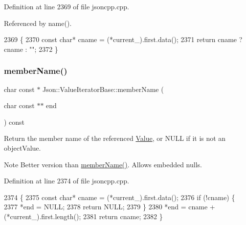Definition at line 2369 of file jsoncpp.\+cpp.



Referenced by name().


\begin{DoxyCode}
2369                                                 \{
2370   \textcolor{keyword}{const} \textcolor{keywordtype}{char}* cname = (*current\_).first.data();
2371   \textcolor{keywordflow}{return} cname ? cname : \textcolor{stringliteral}{""};
2372 \}
\end{DoxyCode}
\mbox{\label{class_json_1_1_value_iterator_base_a391c9cbd0edf9a447b37df00e8ce6059}} 
\subsubsection{\texorpdfstring{member\+Name()}{memberName()}\hspace{0.1cm}{\footnotesize\ttfamily [2/2]}}
{\footnotesize\ttfamily char const  $\ast$ Json\+::\+Value\+Iterator\+Base\+::member\+Name (\begin{DoxyParamCaption}\item[{char const $\ast$$\ast$}]{end }\end{DoxyParamCaption}) const}

Return the member name of the referenced \hyperlink{class_json_1_1_value}{Value}, or N\+U\+LL if it is not an object\+Value. \begin{DoxyNote}{Note}
Better version than \hyperlink{class_json_1_1_value_iterator_base_a54765da6759fd3f1edcbfbaf308ec263}{member\+Name()}. Allows embedded nulls. 
\end{DoxyNote}


Definition at line 2374 of file jsoncpp.\+cpp.


\begin{DoxyCode}
2374                                                                 \{
2375   \textcolor{keyword}{const} \textcolor{keywordtype}{char}* cname = (*current\_).first.data();
2376   \textcolor{keywordflow}{if} (!cname) \{
2377     *end = NULL;
2378     \textcolor{keywordflow}{return} NULL;
2379   \}
2380   *end = cname + (*current\_).first.length();
2381   \textcolor{keywordflow}{return} cname;
2382 \}
\end{DoxyCode}
\mbox{\label{class_json_1_1_value_iterator_base_a522989403c976fdbb94da846b99418db}} 
